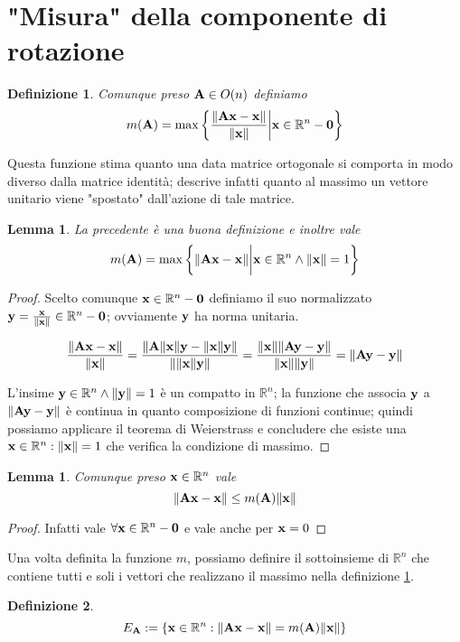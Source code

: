 \documentclass[a4paper,11pt,openright,twoside	]{book}
\newtheorem{definition}{Definizione}[section]
\newtheorem{lemma}[theorem]{Lemma}
\begin{document}
\section{"Misura" della componente di rotazione}
\begin{definition}
\label{def:misura}
Comunque preso  $  \vb{A} \in O(n) $ definiamo
\[ m(\vb{A}) = \max \bigg\{ \frac{\norm{\vb{Ax-x}}}{\norm{\vb{x}}} \bigg|  \vb{x} \in \mathbb{R}^{n}-\vb{0} \bigg\} \]
\end{definition}
Questa funzione stima quanto una data matrice ortogonale si comporta in modo diverso dalla matrice identità; descrive infatti quanto al massimo un vettore unitario viene "spostato" dall'azione di tale matrice. 
\begin{lemma}
La precedente è una buona definizione e inoltre vale
\[ m(\vb{A}) = \max \bigg\{ \norm{\vb{Ax-x}} \bigg|  \vb{x} \in \mathbb{R}^{n} \land \norm{\vb{x}} = 1 \bigg\} \]
\end{lemma}

\begin{proof}
Scelto comunque $\vb{x} \in \mathbb{R}^{n}-\vb{0}$ definiamo il suo normalizzato  $ \vb{y}  =  \frac{\vb{x}}{\norm{\vb{x}}} \in \mathbb{R}^{n}-\vb{0}$; ovviamente $ \vb{y} $ ha norma unitaria.

\[ \frac{\norm{\vb{Ax-x}}}{\norm{\vb{x}}} = \frac{\norm{\vb{A}\norm{\vb{x}} \vb{y}-\norm{\vb{x}} \vb{y}}}{\norm{\norm{\vb{x}} \vb{y}}} =   \frac{\norm{\vb{x}} \norm{\vb{Ay-y}}}{\norm{\vb{x}} \norm{\vb{y}}} = \norm{\vb{Ay-y}} \]

L'insime $\vb{y} \in \mathbb{R}^{n} \land \norm{\vb{y}} = 1 $  è un compatto in  $\mathbb{R}^{n}$; la funzione che associa $\vb{y}$ a  $\norm{\vb{Ay-y}}$ è continua in quanto composizione di funzioni continue; quindi possiamo applicare il teorema di Weierstrass e concludere che esiste una $\vb{x} \in \mathbb{R}^{n} : \norm{\vb{x}} = 1$ che verifica la condizione di massimo. 
\end{proof}

\begin{lemma}
Comunque preso $ \vb{x} \in \mathbb{R}^{n}$  vale  \[ \norm{\vb{Ax-x}} \leq m(\vb{A}) \norm{\vb{x}} \]
\end{lemma}

\begin{proof}
Infatti vale $\forall \vb{x} \in \mathbb{R}^{n}-\vb{0}$  e vale anche per  $\vb{x}=0$
\end{proof}
Una volta definita la funzione $m$, possiamo definire il sottoinsieme di $\mathbb{R}^n$ che contiene tutti e soli i vettori che realizzano il massimo nella definizione \ref{def:misura}. 
\begin{definition}
\[ E_{\vb{A}} := \{ \vb{x} \in \mathbb{R}^{n} :  \norm{\vb{Ax - x}} = m(\vb{A}) \norm{\vb{x}}\} \]
\end{definition}
\end{document}

